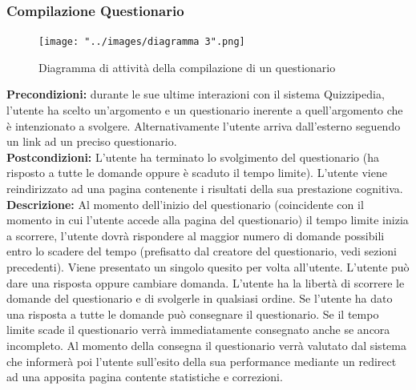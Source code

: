 \documentclass[a4paper,11pt]{article}
\begin{document}
\subsubsection{Compilazione Questionario}
\begin{figure}[h!]
\begin{center}
	\texttt{[image: "../images/diagramma 3".png]}
	\caption{Diagramma di attività della compilazione di un questionario}
\end{center}
\end{figure}
\textbf{Precondizioni:} durante le sue ultime interazioni con il sistema Quizzipedia, l'utente ha scelto un'argomento e un questionario inerente a quell'argomento che è intenzionato a svolgere. Alternativamente l'utente arriva dall'esterno seguendo un link ad un preciso questionario.\\
\textbf{Postcondizioni:} L'utente ha terminato lo svolgimento del questionario (ha risposto a tutte le domande oppure è scaduto il tempo limite). L'utente viene reindirizzato ad una pagina contenente i risultati della sua prestazione cognitiva.\\
\textbf{Descrizione:} Al momento dell'inizio del questionario (coincidente con il momento in cui l'utente accede alla pagina del questionario) il tempo limite inizia a scorrere, l'utente dovrà rispondere al maggior numero di domande possibili entro lo scadere del tempo (prefisatto dal creatore del questionario, vedi sezioni precedenti). Viene presentato un singolo quesito per volta all'utente. L'utente può dare una risposta oppure cambiare domanda. L'utente ha la libertà di scorrere le domande del questionario e di svolgerle in qualsiasi ordine. Se l'utente ha dato una risposta a tutte le domande può consegnare il questionario. Se il tempo limite scade il questionario verrà immediatamente consegnato anche se ancora incompleto. Al momento della consegna il questionario verrà valutato dal sistema che informerà poi l'utente sull'esito della sua performance mediante un redirect ad una apposita pagina contente statistiche e correzioni.\\
\newpage
\end{document}
